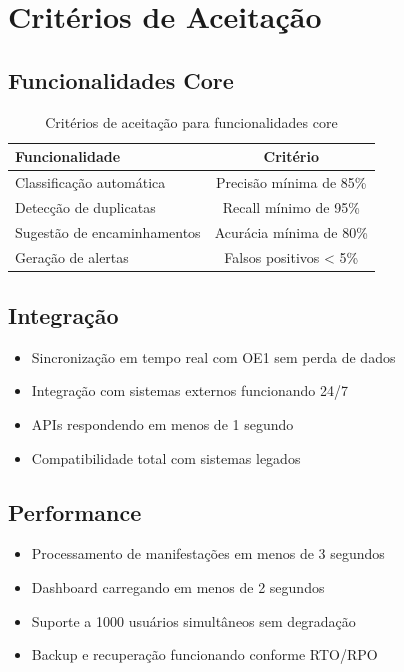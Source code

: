 \documentclass[12pt,a4paper]{article}
\begin{document}
\section{Critérios de Aceitação}

\subsection{Funcionalidades Core}

\begin{table}[h]
\centering
\begin{tabular}{@{}lc@{}}
\toprule
\textbf{Funcionalidade} & \textbf{Critério} \\
\midrule
Classificação automática & Precisão mínima de 85\% \\
Detecção de duplicatas & Recall mínimo de 95\% \\
Sugestão de encaminhamentos & Acurácia mínima de 80\% \\
Geração de alertas & Falsos positivos < 5\% \\
\bottomrule
\end{tabular}
\caption{Critérios de aceitação para funcionalidades core}
\end{table}

\subsection{Integração}

\begin{itemize}[leftmargin=*]
    \item Sincronização em tempo real com OE1 sem perda de dados
    \item Integração com sistemas externos funcionando 24/7
    \item APIs respondendo em menos de 1 segundo
    \item Compatibilidade total com sistemas legados
\end{itemize}

\subsection{Performance}

\begin{itemize}[leftmargin=*]
    \item Processamento de manifestações em menos de 3 segundos
    \item Dashboard carregando em menos de 2 segundos
    \item Suporte a 1000 usuários simultâneos sem degradação
    \item Backup e recuperação funcionando conforme RTO/RPO
\end{itemize}
\end{document}
